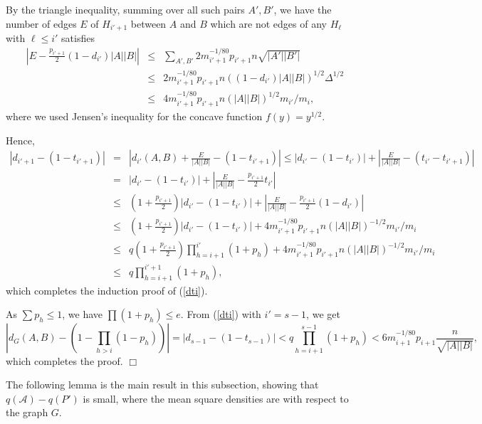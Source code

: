 \documentclass[11pt]{article}
\newenvironment{proof}
      {\medskip\noindent{\bf Proof:}\hspace{1mm}}
      {\hfill$\Box$\medskip}
\begin{document}
\begin{proof}
By the triangle inequality, summing over all such pairs $A',B'$, we have the
number of edges $E$ of $H_{i'+1}$ between $A$ and $B$ which are not edges of
any $H_{\ell}$ with $\ell \leq i'$ satisfies
\begin{eqnarray*}\left|E-\frac{p_{i'+1}}{2}(1-d_{i'})|A||B|\right| & \leq &
\sum_{A',B'}2m_{i'+1}^{-1/80}p_{i'+1}n\sqrt{|A'||B'|} \\ & \leq &
2m_{i'+1}^{-1/80}p_{i'+1}n((1-d_{i'})|A||B|)^{1/2}\Delta^{1/2} \\ & \leq &
4m_{i'+1}^{-1/80}p_{i'+1}n(|A||B|)^{1/2}m_{i'}/m_i,\end{eqnarray*}
where we used Jensen's inequality for the concave function $f(y)=y^{1/2}$.

Hence,
\begin{eqnarray*}|d_{i'+1}-(1-t_{i'+1})|& = &
\left|d_{i'}(A,B)+\frac{E}{|A||B|} -(1-t_{i'+1})\right| \leq
 |d_{i'}-(1-t_{i'})|+\left|\frac{E}{|A||B|} -(t_{i'}-t_{i'+1})\right| \\ & = &
 |d_{i'}-(1-t_{i'})|+\left|\frac{E}{|A||B|} -\frac{p_{i'+1}}{2}t_{i'}\right|\\
& \leq &   (1+\frac{p_{i'+1}}{2})|d_{i'}-(1-t_{i'})|+\left|\frac{E}{|A||B|}
-\frac{p_{i'+1}}{2}(1-d_{i'})\right| \\ & \leq &
(1+\frac{p_{i'+1}}{2})|d_{i'}-(1-t_{i'})|+4m_{i'+1}^{-1/80}p_{i'+1}n(|A||B|)^{-1/2}m_{i'}/m_i
\\ & \leq & q\left(1+\frac{p_{i'+1}}{2}\right)\prod_{h=i+1}^{i'}(1+p_h) +
4m_{i'+1}^{-1/80}p_{i'+1}n(|A||B|)^{-1/2}m_{i'}/m_i \\ & \leq &
q\prod_{h=i+1}^{i'+1}(1+p_h),
\end{eqnarray*}
which completes the induction proof of (\ref{dti}).

As $\sum p_h \leq 1$, we have $\prod (1+p_h) \leq e$. From (\ref{dti}) with
$i'=s-1$, we get
$$\left|d_G(A,B)-\left(1-\prod_{h>i}(1-p_h)\right)\right|=|d_{s-1}-(1-t_{s-1})|<q\prod_{h=i+1}^{s-1}(1+p_h)<6m_{i+1}^{-1/80}p_{i+1}\frac{n}{\sqrt{|A||B|}},$$
which completes the proof.
\end{proof}

The following lemma is the main result in this subsection, showing that
$q(\mathcal{A})-q(P')$ is small, where the mean square densities are with
respect to the graph $G$.
\end{document}
